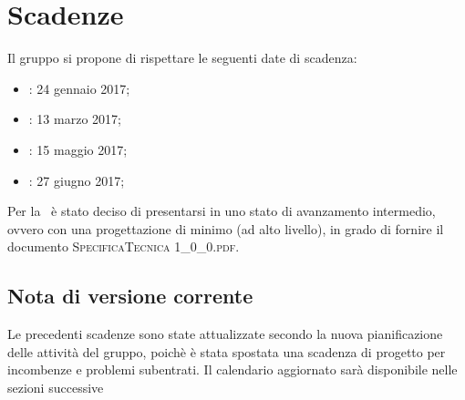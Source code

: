 \newpage
\section{Scadenze}
Il gruppo \textit{\gruppo} si propone di rispettare le seguenti date di scadenza:
\begin{itemize}
	\item \textbf{\RR}: 24 gennaio 2017;
	\item \textbf{\RP}: 13 marzo 2017;
	\item \textbf{\RQ}: 15 maggio 2017;
	\item \textbf{\RA}: 27 giugno 2017;
\end{itemize}
Per la \RP\ è stato deciso di presentarsi in uno stato di avanzamento intermedio, ovvero con una progettazione di minimo (ad alto livello), in grado di fornire il documento \textsc{SpecificaTecnica 1\_0\_0.pdf}.

\subsection{Nota di versione corrente}
Le precedenti scadenze sono state attualizzate secondo la nuova pianificazione delle attività del gruppo, poichè è stata spostata una scadenza di progetto per incombenze e problemi subentrati. Il calendario aggiornato sarà disponibile nelle sezioni successive